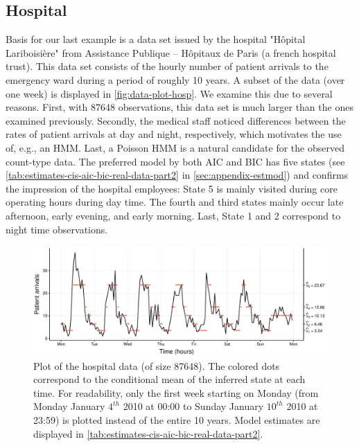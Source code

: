 \documentclass[]{interact}\usepackage[]{graphicx}\usepackage[dvipsnames]{xcolor}
\makeatletter
\def\maxwidth{ %
  \ifdim\Gin@nat@width>\linewidth
    \linewidth
  \else
    \Gin@nat@width
  \fi
}
\newenvironment{knitrout}{}{} %
\theoremstyle{plain}%
\theoremstyle{definition}
\theoremstyle{remark}
\makeatother
\begin{document}
\subsection{Hospital}
\label{sec:sm-hospital}

Basis for our last example is a data set issued by the hospital "H\^{o}pital Lariboisi\`ere" from Assistance Publique -- H\^{o}pitaux de Paris (a french hospital trust).
This data set consists of the hourly number of patient arrivals to the emergency ward during a period of roughly 10 years.
A subset of the data (over one week) is displayed in \autoref{fig:data-plot-hosp}.
We examine this due to several reasons.
First, with 87648 observations, this data set is much larger than the ones examined previously.
Secondly, the medical staff noticed differences between the rates of patient arrivals at day and night, respectively, which motivates the use of, e.g., an HMM.
Last, a Poisson HMM is a natural candidate for the observed count-type data. The preferred model by both AIC and BIC has five states (see \autoref{tab:estimates-cis-aic-bic-real-data-part2} in \autoref{sec:appendix-estmod})
and confirms the impression of the hospital employees: State 5 is mainly visited during core operating hours during day time.
The fourth and third states mainly occur late afternoon, early evening, and early morning.
Last, State 1 and 2 correspond to night time observations.    



\begin{knitrout}
\color{fgcolor}\begin{figure}[htb]

{\centering \includegraphics[width=\maxwidth]{figure/data-plot-hosp-1} 

}

\caption{Plot of the hospital data (of size 87648). The colored dots correspond to the conditional mean of the inferred state at each time. For readability, only the first week starting on Monday (from Monday January $4^{th}$ 2010 at 00:00 to Sunday January $10^{th}$ 2010 at 23:59) is plotted instead of the entire 10 years. Model estimates are displayed in \autoref{tab:estimates-cis-aic-bic-real-data-part2}.}\label{fig:data-plot-hosp}
\end{figure}

\end{knitrout}
\end{document}
